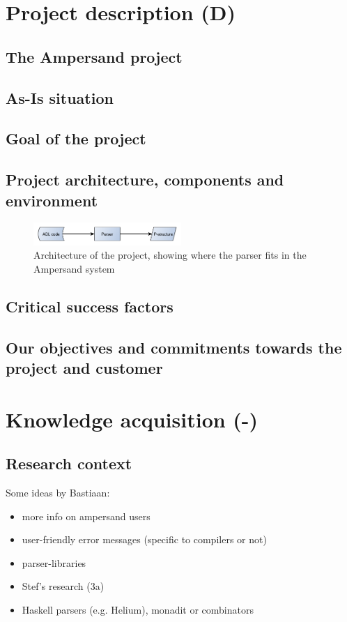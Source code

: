 
\section{Project description (D)}
\label{sec:project-description}
\subsection{The Ampersand project}
\subsection{As-Is situation}
\subsection{Goal of the project}
\subsection{Project architecture, components and environment}
\begin{figure}[hb]
  \centering
  \includegraphics[width=0.5\textwidth]{Figures/Architecture}
  \caption[Architecture of the project]{Architecture of the project, showing where the parser fits in the Ampersand system}
\end{figure}

\subsection{Critical success factors}
\subsection{Our objectives and commitments towards the project and customer}

\section{Knowledge acquisition (-)}
\label{sec:knowledge-acquisition}
\subsection{Research context}
Some ideas by Bastiaan:
\begin{itemize}
  \item more info on ampersand users
  \item user-friendly error messages (specific to compilers or not)
  \item parser-libraries
  \item Stef's research (3a)
  \item Haskell parsers (e.g. Helium), monadit or combinators
\end{itemize}

